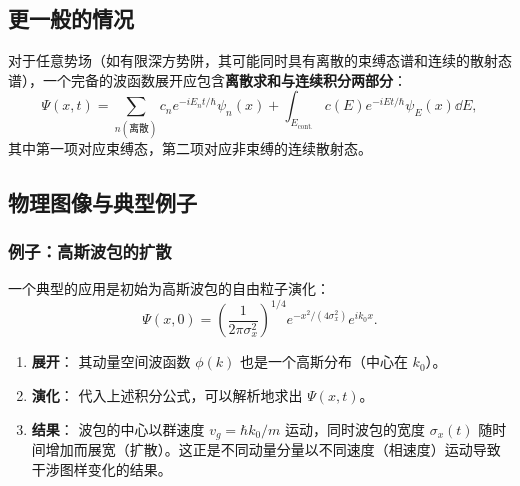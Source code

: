 \subsection{更一般的情况}
对于任意势场（如有限深方势阱，其可能同时具有离散的束缚态谱和连续的散射态谱），一个完备的波函数展开应包含\textbf{离散求和与连续积分两部分}：
\[
\Psi(x, t) = \sum_{n(\text{离散})} c_n e^{-iE_n t/\hbar} \psi_n(x) + \int_{E_{\text{cont.}}} c(E) e^{-iE t/\hbar} \psi_E(x) \dd{E},
\]
其中第一项对应束缚态，第二项对应非束缚的连续散射态。
\subsection{物理图像与典型例子}

\subsubsection{例子：高斯波包的扩散}
一个典型的应用是初始为高斯波包的自由粒子演化：
\[
\Psi(x, 0) = \left( \frac{1}{2\pi \sigma_x^2} \right)^{1/4} e^{-x^2/(4\sigma_x^2)} e^{ik_0 x}.
\]
\begin{enumerate}
	\item \textbf{展开}： 其动量空间波函数 \(\phi(k)\) 也是一个高斯分布（中心在 \(k_0\)）。
	\item \textbf{演化}： 代入上述积分公式，可以解析地求出 \(\Psi(x, t)\)。
	\item \textbf{结果}： 波包的中心以群速度 \(v_g = \hbar k_0 / m\) 运动，同时波包的宽度 \(\sigma_x(t)\) 随时间增加而展宽（扩散）。这正是不同动量分量以不同速度（相速度）运动导致干涉图样变化的结果。
\end{enumerate}